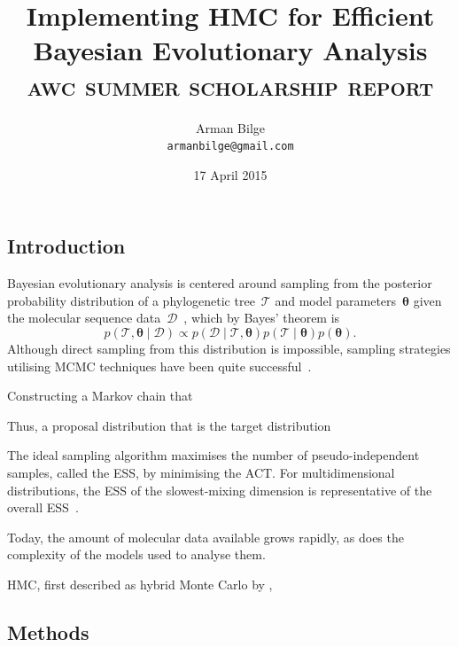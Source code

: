 \documentclass{article}
\title{Implementing \acl{HMC} for Efficient Bayesian Evolutionary Analysis \\
           \Large\textsc{awc summer scholarship report}}
\author{Arman Bilge \\ \texttt{armanbilge@gmail.com}}
\date{17 April 2015}
\renewcommand{\vec}[1]{\ensuremath{\boldsymbol{\mathbf{#1}}}}
\begin{document}
    \maketitle

    \subsection*{Introduction}

    Bayesian evolutionary analysis is centered around sampling from the
        posterior probability distribution of a phylogenetic
        tree~$\mathcal{T}$ and model parameters~$\vec\theta$
        given the molecular sequence data~$\mathcal{D}$~\cite{Bou+14},
        which by Bayes' theorem is
        \begin{equation}
            p\left(\mathcal{T}, \vec\theta \mid \mathcal{D}\right)
                \propto p\left(\mathcal{D} \mid \mathcal{T},\vec\theta\right)
                p\left(\mathcal{T} \mid \vec\theta\right) p\left(\vec\theta\right).
        \end{equation}
    Although direct sampling from this distribution is impossible, sampling
        strategies utilising \ac{MCMC} techniques have been quite
        successful~\cite{RH03,Dru+12,Bou+14}.

    Constructing a Markov chain that

    Thus, a proposal distribution that is the target distribution

    The ideal sampling algorithm maximises the number of pseudo-independent
        samples, called the \ac{ESS}, by minimising the \ac{ACT}.
    For multidimensional distributions, the \ac{ESS} of the slowest-mixing
        dimension is representative of the overall \ac{ESS}~\cite{Tho10}.

    Today, the amount of molecular data available grows rapidly, as does the
        complexity of the models used to analyse them.

    \ac{HMC}, first described as hybrid Monte Carlo by \textcite{Dua+87},

    \subsection*{Methods}
\end{document}

